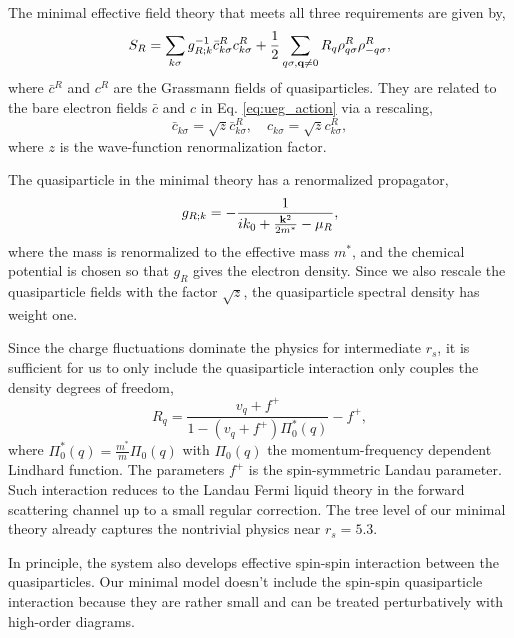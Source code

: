 \documentclass[reprint,amsmath,amssymb,aps,prb]{revtex4-1}
\begin{document}
The minimal effective field theory that meets all three requirements are given by,
\begin{equation}
    \label{eq:renorm_action}
    S_R=\sum_{k \sigma} g_{R;k}^{-1}\bar{c}^R_{k \sigma} c^R_{k \sigma} + \frac{1}{2}\sum_{q\sigma, \mathbf{q} \neq 0}  R_q \rho^R_{q\sigma} \rho^R_{-q\sigma},
\end{equation}
where $\bar{c}^R$ and $c^R$ are the Grassmann fields of quasiparticles. They are related to the bare electron fields $\bar{c}$ and $c$ in Eq. \eqref{eq:ueg_action} via a rescaling,
\begin{equation}
    \label{eq:rescaling}
    \bar{c}_{k\sigma} = \sqrt{z} \bar{c}^R_{k\sigma}, \quad c_{k\sigma} = \sqrt{z} c^R_{k\sigma},
\end{equation}
where $z$ is the wave-function renormalization factor.

The quasiparticle in the minimal theory has a renormalized propagator,
\begin{equation}
    \label{eq:gR}
    g_{R;k}=-\frac{1}{ik_0+\frac{\mathbf{k}^2}{2m^*}-\mu_R},
\end{equation}
where the mass is renormalized to the effective mass $m^*$, and the chemical potential is chosen so that $g_R$ gives the electron density. Since we also rescale the quasiparticle fields with the factor $\sqrt{z}$, the quasiparticle spectral density has weight one.

Since the charge fluctuations dominate the physics for intermediate $r_s$, it is sufficient for us to only include the quasiparticle interaction only couples the density degrees of freedom,
\begin{equation}
    \label{eq:R}
    R_q=\frac{v_q+f^+}{1-(v_q+f^+)\Pi^*_0(q)}-f^+,
\end{equation}
where $\Pi_0^*(q)=\frac{m^*}{m}\Pi_0(q)$ with $\Pi_0(q)$ the momentum-frequency dependent Lindhard function. The parameters $f^+$ is the spin-symmetric Landau parameter. Such interaction reduces to the Landau Fermi liquid theory in the forward scattering channel up to a small regular correction. The tree level of our minimal theory already captures the nontrivial physics near $r_s=5.3$.

In principle, the system also develops effective spin-spin interaction between the quasiparticles. Our minimal model doesn't include the spin-spin quasiparticle interaction because they are rather small and can be treated perturbatively with high-order diagrams.

\end{document}
